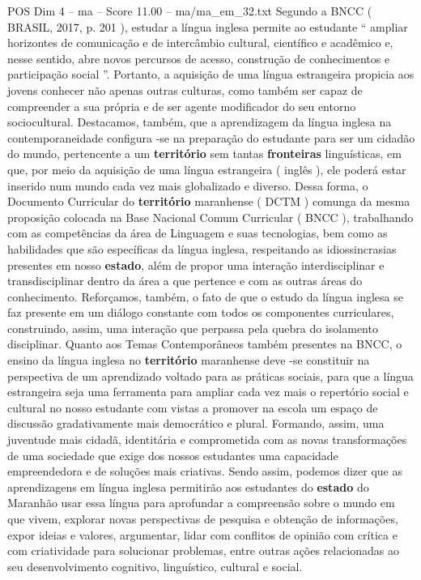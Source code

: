 \begin{textsample}{POS Dim 4 – ma – Score 11.00 – ma/ma\_em\_32.txt}
Segundo a BNCC ( BRASIL, 2017, p. 201 ), estudar a língua inglesa permite ao estudante “ ampliar horizontes de comunicação e de intercâmbio cultural, científico e acadêmico e, nesse sentido, abre novos percursos de acesso, construção de conhecimentos e participação social ”.
Portanto, a aquisição de uma língua estrangeira propicia aos jovens conhecer não apenas outras culturas, como também ser capaz de compreender a sua própria e de ser agente modificador do seu entorno sociocultural.
Destacamos, também, que a aprendizagem da língua inglesa na contemporaneidade configura -se na preparação do estudante para ser um cidadão do mundo, pertencente a um \textbf{território} sem tantas \textbf{fronteiras} linguísticas, em que, por meio da aquisição de uma língua estrangeira ( inglês ), ele poderá estar inserido num mundo cada vez mais globalizado e diverso.
Dessa forma, o Documento Curricular do \textbf{território} maranhense ( DCTM ) comunga da mesma proposição colocada na Base Nacional Comum Curricular ( BNCC ), trabalhando com as competências da área de Linguagem e suas tecnologias, bem como as habilidades que são específicas da língua inglesa, respeitando as idiossincrasias presentes em nosso \textbf{estado}, além de propor uma interação interdisciplinar e transdisciplinar dentro da área a que pertence e com as outras áreas do conhecimento.
Reforçamos, também, o fato de que o estudo da língua inglesa se faz presente em um diálogo constante com todos os componentes curriculares, construindo, assim, uma interação que perpassa pela quebra do isolamento disciplinar.
Quanto aos Temas Contemporâneos também presentes na BNCC, o ensino da língua inglesa no \textbf{território} maranhense deve -se constituir na perspectiva de um aprendizado voltado para as práticas sociais, para que a língua estrangeira seja uma ferramenta para ampliar cada vez mais o repertório social e cultural no nosso estudante com vistas a promover na escola um espaço de discussão gradativamente mais democrático e plural.
Formando, assim, uma juventude mais cidadã, identitária e comprometida com as novas transformações de uma sociedade que exige dos nossos estudantes uma capacidade empreendedora e de soluções mais criativas.
Sendo assim, podemos dizer que as aprendizagens em língua inglesa permitirão aos estudantes do \textbf{estado} do Maranhão usar essa língua para aprofundar a compreensão sobre o mundo em que vivem, explorar novas perspectivas de pesquisa e obtenção de informações, expor ideias e valores, argumentar, lidar com conflitos de opinião com crítica e com criatividade para solucionar problemas, entre outras ações relacionadas ao seu desenvolvimento cognitivo, linguístico, cultural e social.

\end{textsample}
